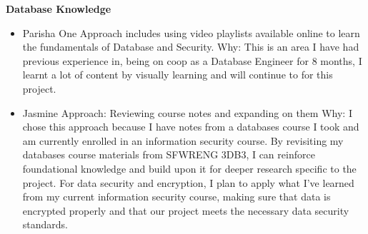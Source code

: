 \documentclass[12pt]{article}
\begin{document}
\begin{enumerate}
  \textbf{Database Knowledge} 
  \begin{itemize}
    \item Parisha 
    \subitem One Approach includes using video playlists available online to learn the fundamentals of Database and Security. 
    \subitem Why: This is an area I have had previous experience in, being on coop as a Database Engineer for 8 months, I learnt a lot of content by visually learning and will continue to for this project.
    \item Jasmine
    \subitem Approach: Reviewing course notes and expanding on them
    \subitem Why: I chose this approach because I have notes from a databases course I took and am currently enrolled in an information security course. By revisiting my databases course materials from SFWRENG 3DB3, I can reinforce foundational knowledge and build upon it for deeper research specific to the project. For data security and encryption, I plan to apply what I've learned from my current information security course, making sure that data is encrypted properly and that our project meets the necessary data security standards.
  \end{itemize}


\end{enumerate}
\end{document}

